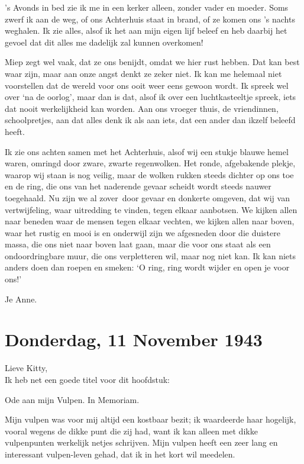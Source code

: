 \documentclass{book}
\begin{document}
's Avonds in bed zie ik me in een kerker alleen, zonder vader en moeder.  Soms
zwerf ik aan de weg, of ons Achterhuis staat in brand, of ze komen ons 's nachts
weghalen. Ik zie alles, alsof ik het aan mijn eigen lijf beleef en heb daarbij
het gevoel dat dit alles me dadelijk zal kunnen overkomen!

Miep zegt wel vaak, dat ze ons benijdt, omdat we hier rust hebben. Dat kan best
waar zijn, maar aan onze angst denkt ze zeker niet. Ik kan me helemaal niet
voorstellen dat de wereld voor ons ooit weer eens gewoon wordt. Ik spreek wel
over `na de oorlog', maar dan is dat, alsof ik over een luchtkasteeltje spreek,
iets dat nooit werkelijkheid kan worden. Aan ons vroeger thuis, de vriendinnen,
schoolpretjes, aan dat alles denk ik als aan iets, dat een ander dan ikzelf
beleefd heeft.

Ik zie ons achten samen met het Achterhuis, alsof wij een stukje blauwe hemel
waren, omringd door zware, zwarte regenwolken. Het ronde, afgebakende plekje,
waarop wij staan is nog veilig, maar de wolken rukken steeds dichter op ons toe
en de ring, die ons van het naderende gevaar scheidt wordt steeds nauwer
toegehaald. Nu zijn we al zover~door gevaar en donkerte omgeven, dat wij van
vertwijfeling, waar uitredding te vinden, tegen elkaar aanbotsen. We kijken
allen naar beneden waar de mensen tegen elkaar vechten, we kijken allen naar
boven, waar het rustig en mooi is en onderwijl zijn we afgesneden door die
duistere massa, die ons niet naar boven laat gaan, maar die voor ons staat als
een ondoordringbare muur, die ons verpletteren wil, maar nog niet kan. Ik kan
niets anders doen dan roepen en smeken: `O ring, ring wordt wijder en open je
voor ons!'

Je Anne.

\section*{Donderdag, 11 November 1943}

Lieve Kitty,\\
Ik heb net een goede titel voor dit hoofdstuk:

Ode aan mijn Vulpen. In Memoriam.

Mijn vulpen was voor mij altijd een kostbaar bezit; ik waardeerde haar hogelijk,
vooral wegens de dikke punt die zij had, want ik kan alleen met dikke
vulpenpunten werkelijk netjes schrijven. Mijn vulpen heeft een zeer lang en
interessant vulpen-leven gehad, dat ik in het kort wil meedelen.
\end{document}
